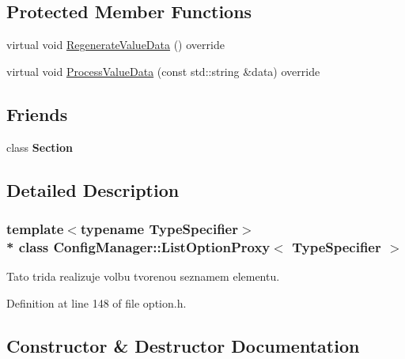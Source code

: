 \subsection*{Protected Member Functions}
\begin{DoxyCompactItemize}
\item 
virtual void \hyperlink{class_config_manager_1_1_list_option_proxy_ab7d04f2f12da920861c6cef6d8dca501}{Regenerate\+Value\+Data} () override
\item 
virtual void \hyperlink{class_config_manager_1_1_list_option_proxy_ade1da6bf53c9bef0806755e4f805284e}{Process\+Value\+Data} (const std\+::string \&data) override
\end{DoxyCompactItemize}
\subsection*{Friends}
\begin{DoxyCompactItemize}
\item 
class {\bfseries Section}\hypertarget{class_config_manager_1_1_list_option_proxy_a0bd6fc422149e1c8416770631b28d40c}{}\label{class_config_manager_1_1_list_option_proxy_a0bd6fc422149e1c8416770631b28d40c}

\end{DoxyCompactItemize}


\subsection{Detailed Description}
\subsubsection*{template$<$typename Type\+Specifier$>$\\*
class Config\+Manager\+::\+List\+Option\+Proxy$<$ Type\+Specifier $>$}

Tato trida realizuje volbu tvorenou seznamem elementu. 

Definition at line 148 of file option.\+h.



\subsection{Constructor \& Destructor Documentation}
